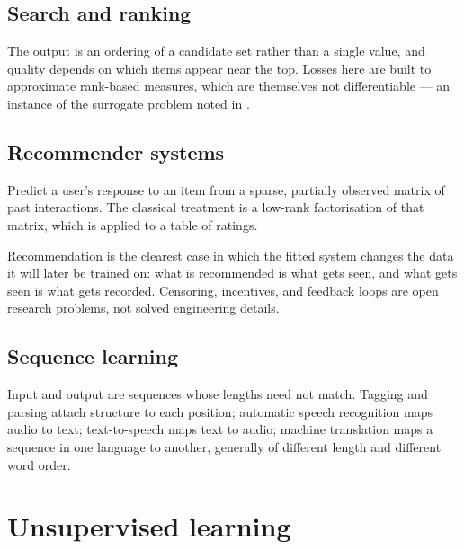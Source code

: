 
\subsection{Search and ranking}

The output is an ordering of a candidate set rather than a single value, and
quality depends on which items appear near the top. Losses here are built to
approximate rank-based measures, which are themselves not differentiable --- an
instance of the surrogate problem noted in .

\subsection{Recommender systems}

Predict a user's response to an item from a sparse, partially observed matrix of
past interactions. The classical treatment is a low-rank factorisation of that
matrix, which is  applied to a table of ratings.

\begin{remark}
Recommendation is the clearest case in which the fitted system changes the data
it will later be trained on: what is recommended is what gets seen, and what
gets seen is what gets recorded. Censoring, incentives, and feedback loops are
open research problems, not solved engineering details.
\end{remark}

\subsection{Sequence learning}

Input and output are sequences whose lengths need not match. Tagging and parsing
attach structure to each position; automatic speech recognition maps audio to
text; text-to-speech maps text to audio; machine translation maps a sequence in
one language to another, generally of different length and different word order.

\section{Unsupervised learning}

